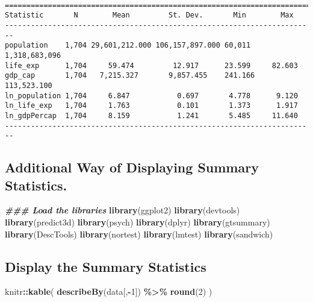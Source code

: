\documentclass[
]{article}
\newenvironment{Shaded}{\begin{snugshade}}{\end{snugshade}}
\newcommand{\DecValTok}[1]{\textcolor[rgb]{0.00,0.00,0.81}{#1}}
\newcommand{\DocumentationTok}[1]{\textcolor[rgb]{0.56,0.35,0.01}{\textbf{\textit{#1}}}}
\newcommand{\FunctionTok}[1]{\textcolor[rgb]{0.13,0.29,0.53}{\textbf{#1}}}
\newcommand{\NormalTok}[1]{#1}
\newcommand{\SpecialCharTok}[1]{\textcolor[rgb]{0.81,0.36,0.00}{\textbf{#1}}}
\begin{document}
\begin{verbatim}

========================================================================
Statistic       N        Mean         St. Dev.       Min        Max     
------------------------------------------------------------------------
population    1,704 29,601,212.000 106,157,897.000 60,011  1,318,683,096
life_exp      1,704     59.474         12.917      23.599     82.603    
gdp_cap       1,704   7,215.327       9,857.455    241.166  113,523.100 
ln_population 1,704     6.847           0.697       4.778      9.120    
ln_life_exp   1,704     1.763           0.101       1.373      1.917    
ln_gdpPercap  1,704     8.159           1.241       5.485     11.640    
------------------------------------------------------------------------
\end{verbatim}

\hypertarget{additional-way-of-displaying-summary-statistics.}{%
\subsection{Additional Way of Displaying Summary
Statistics.}\label{additional-way-of-displaying-summary-statistics.}}

\begin{Shaded}
\begin{Highlighting}[]
\DocumentationTok{\#\#\# Load the libraries}
\FunctionTok{library}\NormalTok{(ggplot2)}
\FunctionTok{library}\NormalTok{(devtools)}
\FunctionTok{library}\NormalTok{(predict3d)}
\FunctionTok{library}\NormalTok{(psych)}
\FunctionTok{library}\NormalTok{(dplyr)}
\FunctionTok{library}\NormalTok{(gtsummary)}
\FunctionTok{library}\NormalTok{(DescTools)}
\FunctionTok{library}\NormalTok{(nortest) }
\FunctionTok{library}\NormalTok{(lmtest)}
\FunctionTok{library}\NormalTok{(sandwich)}
\end{Highlighting}
\end{Shaded}

\hypertarget{display-the-summary-statistics}{%
\subsection{Display the Summary
Statistics}\label{display-the-summary-statistics}}

\begin{Shaded}
\begin{Highlighting}[]
\NormalTok{knitr}\SpecialCharTok{::}\FunctionTok{kable}\NormalTok{(}
  \FunctionTok{describeBy}\NormalTok{(data[,}\SpecialCharTok{{-}}\DecValTok{1}\NormalTok{]) }\SpecialCharTok{\%\textgreater{}\%} \FunctionTok{round}\NormalTok{(}\DecValTok{2}\NormalTok{) }
\NormalTok{)}
\end{Highlighting}
\end{Shaded}
\end{document}
